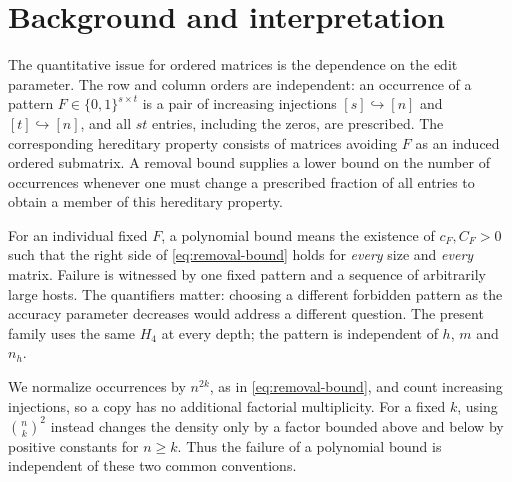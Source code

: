 \section{Background and interpretation}\label{sec:context}
The quantitative issue for ordered matrices is the dependence on the edit
parameter.  The row and column orders are independent: an occurrence of a
pattern $F\in\{0,1\}^{s\times t}$ is a pair of increasing injections
$[s]\hookrightarrow[n]$ and $[t]\hookrightarrow[n]$, and all $st$ entries,
including the zeros, are prescribed. The corresponding hereditary
property consists of matrices avoiding $F$ as an induced ordered
submatrix.  A removal bound supplies a lower bound on the number of
occurrences whenever one must change a prescribed fraction of all
entries to obtain a member of this hereditary property.

For an individual fixed $F$, a polynomial bound means the existence of
$c_F,C_F>0$ such that the right side of \eqref{eq:removal-bound} holds
for \emph{every} size and \emph{every} matrix.  Failure is witnessed by
one fixed pattern and a sequence of arbitrarily large hosts.  The
quantifiers matter: choosing a different forbidden pattern as the
accuracy parameter decreases would address a different question.
The present family uses the same $H_4$ at every depth; the pattern is
independent of $h$, $m$ and $n_h$.


We normalize occurrences by $n^{2k}$, as in
\eqref{eq:removal-bound}, and count increasing injections, so a copy
has no additional factorial multiplicity. For a fixed $k$, using
$\binom{n}{k}^2$ instead changes the density only by a factor bounded
above and below by positive constants for $n\ge k$. Thus the failure
of a polynomial bound is independent of these two common conventions.

